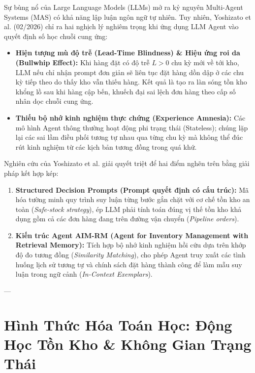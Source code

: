 \documentclass[11pt,a4paper]{article}
\begin{document}
Sự bùng nổ của Large Language Models (LLMs) mở ra kỷ nguyên Multi-Agent Systems (MAS) có khả năng lập luận ngôn ngữ tự nhiên. Tuy nhiên, Yoshizato et al. (02/2026) chỉ ra hai nghịch lý nghiêm trọng khi ứng dụng LLM Agent vào quyết định số học chuỗi cung ứng:
\begin{itemize}[leftmargin=1.5em]
    \item \textbf{Hiện tượng mù độ trễ (Lead-Time Blindness) \& Hiệu ứng roi da (Bullwhip Effect):} Khi hàng đặt có độ trễ $L > 0$ chu kỳ mới về tới kho, LLM nếu chỉ nhận prompt đơn giản sẽ liên tục đặt hàng dồn dập ở các chu kỳ tiếp theo do thấy kho vẫn thiếu hàng. Kết quả là tạo ra làn sóng tồn kho khổng lồ sau khi hàng cập bến, khuếch đại sai lệch đơn hàng theo cấp số nhân dọc chuỗi cung ứng.
    \item \textbf{Thiếu bộ nhớ kinh nghiệm thực chứng (Experience Amnesia):} Các mô hình Agent thông thường hoạt động phi trạng thái (Stateless); chúng lặp lại các sai lầm điều phối tương tự nhau qua từng chu kỳ mà không thể đúc rút kinh nghiệm từ các kịch bản tương đồng trong quá khứ.
\end{itemize}

\begin{coreconceptbox}
Nghiên cứu của Yoshizato et al. giải quyết triệt để hai điểm nghẽn trên bằng giải pháp kết hợp kép:
\begin{enumerate}[leftmargin=1.5em]
    \item \textbf{Structured Decision Prompts (Prompt quyết định có cấu trúc):} Mã hóa tường minh quy trình suy luận từng bước gắn chặt với cơ chế tồn kho an toàn (\textit{Safe-stock strategy}), ép LLM phải tính toán đúng vị thế tồn kho khả dụng gồm cả các đơn hàng đang trên đường vận chuyển (\textit{Pipeline orders}).
    \item \textbf{Kiến trúc Agent AIM-RM (Agent for Inventory Management with Retrieval Memory):} Tích hợp bộ nhớ kinh nghiệm hồi cứu dựa trên khớp độ đo tương đồng (\textit{Similarity Matching}), cho phép Agent truy xuất các tình huống lịch sử tương tự và chính sách đặt hàng thành công để làm mẫu suy luận trong ngữ cảnh (\textit{In-Context Exemplars}).
\end{enumerate}
\end{coreconceptbox}

---

\section{Hình Thức Hóa Toán Học: Động Học Tồn Kho \& Không Gian Trạng Thái}
\end{document}
